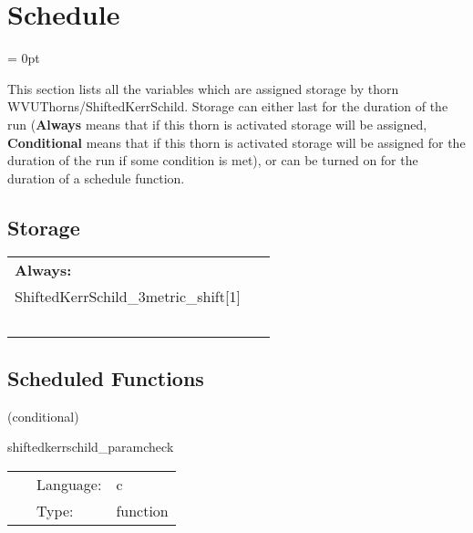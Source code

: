 
\section{Schedule} 


\parskip = 0pt


\noindent This section lists all the variables which are assigned storage by thorn WVUThorns/ShiftedKerrSchild.  Storage can either last for the duration of the run ({\bf Always} means that if this thorn is activated storage will be assigned, {\bf Conditional} means that if this thorn is activated storage will be assigned for the duration of the run if some condition is met), or can be turned on for the duration of a schedule function.


\subsection*{Storage}

\hspace{5mm}

 \begin{tabular*}{160mm}{ll} 

{\bf Always:}&  ~ \\ 
 ShiftedKerrSchild\_3metric\_shift[1] & ~\\ 
~ & ~\\ 
\end{tabular*} 


\subsection*{Scheduled Functions}
\vspace{5mm}

   (conditional) 

\hspace{5mm} shiftedkerrschild\_paramcheck 

\hspace{5mm}{\it check parameters for consitency and unsupported values } 


\hspace{5mm}

 \begin{tabular*}{160mm}{cll} 
~ & Language:  & c \\ 
~ & Type:  & function \\ 
\end{tabular*} 


\vspace{5mm}

